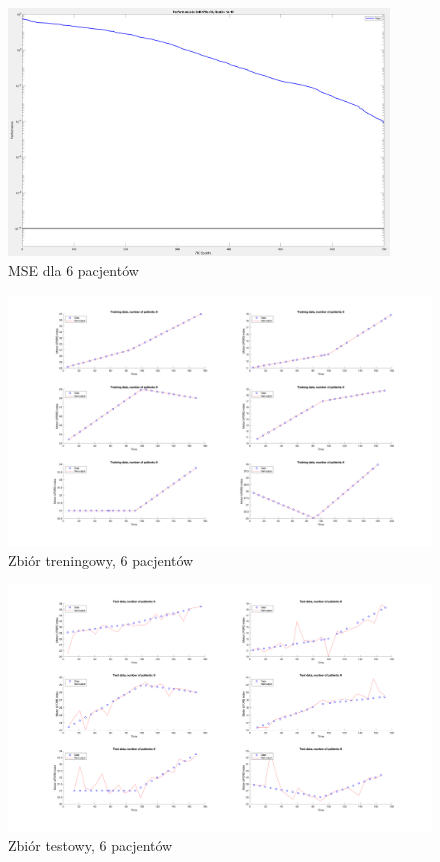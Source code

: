 \documentclass[12pt]{article}
\begin{document}
\begin{figure}[h!]

\centering
\includegraphics[width=0.9\textwidth]{mse-normal-6.png}
\caption{MSE dla 6 pacjentów}

\end{figure}

\begin{figure}[h!]

\includegraphics[width=1.0\textwidth]{training-normal-6.png}
\caption{Zbiór treningowy, 6 pacjentów}

\end{figure}

\begin{figure}[h!]

\includegraphics[width=1.0\textwidth]{test-normal-6.png}
\caption{Zbiór testowy, 6 pacjentów}

\end{figure}
\end{document}
